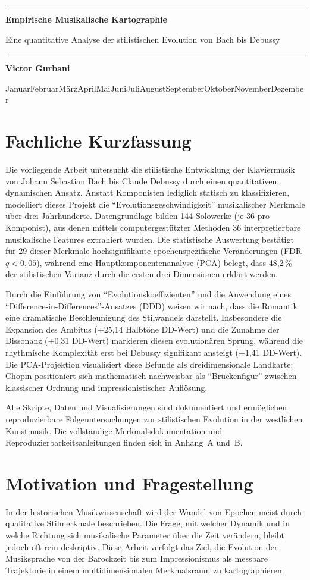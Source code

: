 \documentclass[12pt,a4paper]{article}
\newcommand{\monthyear}{%
    \ifcase\month\or Januar\or Februar\or M\"arz\or April\or Mai\or Juni\or Juli\or August\or September\or Oktober\or November\or Dezember\fi\space \number\year
}
\theoremstyle{definition}
\renewcommand{\maketitle}{
    \begin{titlepage}
        \centering
        \vspace*{1cm}
        {\color{titlecolor}\rule{\linewidth}{1pt}}
        \vspace{1.5cm}

        {\fontsize{28}{34}\selectfont\color{titlecolor}\textbf{Empirische Musikalische Kartographie} \par Eine quantitative Analyse der stilistischen Evolution von Bach bis Debussy\par}

        \vspace{1.5cm}
        {\color{titlecolor}\rule{\linewidth}{1pt}}
        \vspace{2cm}
        
        {\Large\textbf{Victor Gurbani}\par}
        \vspace{0.5cm}
        {\large \monthyear\par}
        
        \vfill
    \end{titlepage}
}
\begin{document}
\maketitle
\hypersetup{pageanchor=false}
\newpage

    \tableofcontents

\newpage
\setcounter{page}{1}
\hypersetup{pageanchor=true}

\section{Fachliche Kurzfassung}
Die vorliegende Arbeit untersucht die stilistische Entwicklung der Klaviermusik von Johann Sebastian Bach bis Claude Debussy durch einen quantitativen, dynamischen Ansatz. Anstatt Komponisten lediglich statisch zu klassifizieren, modelliert dieses Projekt die \enquote{Evolutionsgeschwindigkeit} musikalischer Merkmale über drei Jahrhunderte. Datengrundlage bilden 144 Solowerke (je 36 pro Komponist), aus denen mittels computergestützter Methoden 36 interpretierbare musikalische Features extrahiert wurden. Die statistische Auswertung bestätigt für 29 dieser Merkmale hochsignifikante epochenspezifische Veränderungen (FDR $q<0{,}05$), während eine Hauptkomponentenanalyse (PCA) belegt, dass 48,2\,\% der stilistischen Varianz durch die ersten drei Dimensionen erklärt werden.

Durch die Einführung von \enquote{Evolutionskoeffizienten} und die Anwendung eines \enquote{Difference-in-Differences}-Ansatzes (DDD) weisen wir nach, dass die Romantik eine dramatische Beschleunigung des Stilwandels darstellt. Insbesondere die Expansion des Ambitus (+25,14 Halbtöne DD-Wert) und die Zunahme der Dissonanz (+0,31 DD-Wert) markieren diesen evolutionären Sprung, während die rhythmische Komplexität erst bei Debussy signifikant ansteigt (+1,41 DD-Wert). Die PCA-Projektion visualisiert diese Befunde als dreidimensionale Landkarte: Chopin positioniert sich mathematisch nachweisbar als \enquote{Brückenfigur} zwischen klassischer Ordnung und impressionistischer Auflösung.

Alle Skripte, Daten und Visualisierungen sind dokumentiert und ermöglichen reproduzierbare Folgeuntersuchungen zur stilistischen Evolution in der westlichen Kunstmusik. Die vollständige Merkmalsdokumentation und Reproduzierbarkeitsanleitungen finden sich in Anhang~A und~B.

\section{Motivation und Fragestellung}
In der historischen Musikwissenschaft wird der Wandel von Epochen meist durch qualitative Stilmerkmale beschrieben. Die Frage, mit welcher Dynamik und in welche Richtung sich musikalische Parameter über die Zeit verändern, bleibt jedoch oft rein deskriptiv. Diese Arbeit verfolgt das Ziel, die Evolution der Musiksprache von der Barockzeit bis zum Impressionismus als messbare Trajektorie in einem multidimensionalen Merkmalsraum zu kartographieren.
\end{document}
